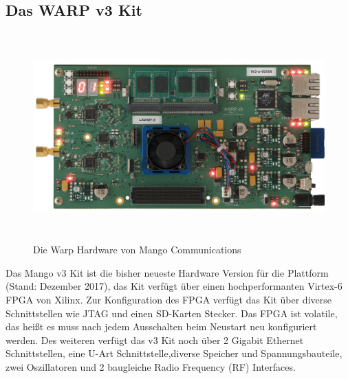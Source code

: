 \documentclass[letterpaper,11pt,ngerman]{article}
\begin{document}
\begin{onehalfspace}
\subsection{Das WARP v3 Kit}
\label{sec:hardware}
\begin{figure}[H]
\begin{center}
\includegraphics[width = 16cm,height=8cm]{w3_kit_med.jpg}
\caption{Die Warp Hardware von Mango Communications \cite{[2]}}
\label{fig11}
\end{center}
\end{figure}
\noindent Das Mango v3 Kit ist die bisher neueste Hardware Version für die Plattform (Stand: Dezember 2017), das Kit verfügt über einen hochperformanten Virtex-6 FPGA von Xilinx. Zur Konfiguration des FPGA verfügt das Kit über diverse Schnittstellen wie JTAG und einen SD-Karten Stecker. Das FPGA ist volatile, das heißt es muss nach jedem Ausschalten beim Neustart neu konfiguriert werden. Des weiteren verfügt das v3 Kit noch über 2 Gigabit Ethernet Schnittstellen, eine U-Art Schnittstelle,diverse Speicher und Spannungsbauteile, zwei Oszillatoren und 2 baugleiche Radio Frequency (RF) Interfaces.

\end{onehalfspace}
\end{document}
